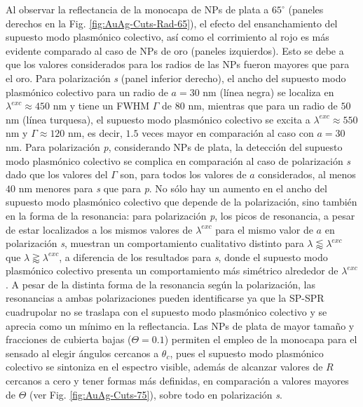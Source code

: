 Al observar la reflectancia de la monocapa de NPs de plata a $65^\circ$ (paneles derechos en la Fig. \ref{fig:AuAg-Cuts-Rad-65}), el efecto del ensanchamiento del supuesto modo plasmónico colectivo, así como el corrimiento al rojo es más evidente comparado al caso de NPs de oro (paneles izquierdos). Esto se debe a  que los valores considerados para los radios de las NPs fueron mayores que para el oro. Para polarización \emph{s} (panel inferior derecho), el ancho del supuesto modo plasmónico colectivo para un radio de $a=30$ nm (línea negra) se localiza en $\lambda^{exc}\approx 450$ nm y tiene un FWHM $\Gamma$ de $80$ nm, mientras que para un radio de $50$ nm (línea turquesa), el supuesto modo plasmónico colectivo se excita a $\lambda^{exc}\approx 550$ nm y $\Gamma\approx 120$ nm, es decir, $1.5$ veces mayor en comparación al caso con $a=30$ nm. Para polarización \emph{p}, considerando NPs de plata, la detección del supuesto modo plasmónico colectivo se complica en comparación al caso de polarización \emph{s} dado que los valores del $\Gamma$ son, para todos los valores de $a$ considerados, al menos $40$ nm menores para \emph{s} que para \emph{p}. No sólo hay un aumento en el ancho del supuesto modo plasmónico colectivo que depende de la polarización, sino también en la forma de la resonancia: para polarización \emph{p}, los picos de resonancia, a pesar de estar localizados a los mismos valores de $\lambda^{exc}$ para el mismo valor de $a$ en polarización \emph{s},  muestran un comportamiento cualitativo distinto para $\lambda\lessapprox\lambda^{exc}$ que $\lambda\gtrapprox\lambda^{exc}$, a diferencia de los resultados para \emph{s}, donde el supuesto modo plasmónico colectivo presenta un comportamiento más simétrico alrededor de $\lambda^{exc}$. A pesar de la distinta forma de la resonancia según la polarización, las resonancias a ambas polarizaciones pueden identificarse ya que la SP-SPR cuadrupolar no se traslapa con el supuesto modo plasmónico colectivo y se aprecia como un mínimo en la reflectancia. Las NPs de plata de mayor tamaño y fracciones de cubierta bajas ($\Theta= 0.1$) permiten el empleo de la monocapa para el sensado al elegir ángulos cercanos a $\theta_c$, pues el supuesto modo plasmónico colectivo se sintoniza en el espectro visible, además de alcanzar valores de $R$ cercanos a cero y tener formas más definidas, en comparación a valores mayores de $\Theta$ (ver Fig. \ref{fig:AuAg-Cuts-75}), sobre todo en polarización \emph{s}.

